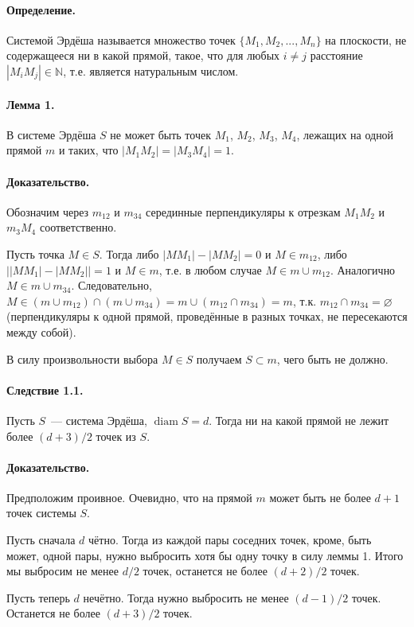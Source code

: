 \documentclass[a4paper,14pt]{article} %
\begin{document}
\renewcommand{\bibname}{Список цитированной литературы}
\renewcommand\refname{\bibname}

\paragraph{Определение.}
Системой Эрдёша называется множество точек $\{M_1, M_2, ..., M_n\}$ на плоскости, не содержащееся ни в какой прямой,
такое, что для любых $i\neq j$ расстояние $|M_i M_j| \in \mathbb{N}$,
т.е. является натуральным числом.

\paragraph{Лемма 1.}
В системе Эрдёша $S$ не может быть точек $M_1$, $M_2$, $M_3$, $M_4$,
лежащих на одной прямой $m$ и таких, что $|M_1 M_2| = |M_3 M_4| = 1$.

\paragraph{Доказательство.}
Обозначим через $m_{12}$ и $m_{34}$ серединные перпендикуляры к отрезкам $M_1 M_2$ и $m_3 M_4$ соответственно.

Пусть точка $M\in S$.
Тогда либо $|MM_1| - |MM_2| = 0$ и $M\in m_{12}$, либо $\left||MM_1| - |MM_2|\right| = 1$ и $M\in m$,
т.е. в любом случае $M\in m \cup m_{12}$.
Аналогично $M\in m \cup m_{34}$.
Следовательно, $M\in (m \cup m_{12}) \cap (m \cup m_{34}) = m \cup (m_{12} \cap m_{34}) = m$,
т.к. $m_{12} \cap m_{34} = \varnothing$ (перпендикуляры к одной прямой, проведённые в разных точках, не пересекаются между собой).

В силу произвольности выбора $M \in S$ получаем $S \subset m$, чего быть не должно.


\paragraph{Следствие 1.1.}
Пусть $S$~--- система Эрдёша, $\mathop{diam} S = d$.
Тогда ни на какой прямой не лежит более $(d+3)/2$ точек из $S$.

\paragraph{Доказательство.}
Предположим проивное.
Очевидно, что на прямой $m$ может быть не более $d+1$ точек системы $S$.

Пусть сначала $d$ чётно.
Тогда из каждой пары соседних точек, кроме, быть может, одной пары,
нужно выбросить хотя бы одну точку в силу леммы 1.
Итого мы выбросим не менее $d/2$ точек,
останется не более $(d+2)/2$ точек.

Пусть теперь $d$ нечётно.
Тогда нужно выбросить не менее $(d-1)/2$ точек.
Останется не более $(d+3)/2$ точек.




\cite{our-mz-rus}
\printbibliography
\end{document}
